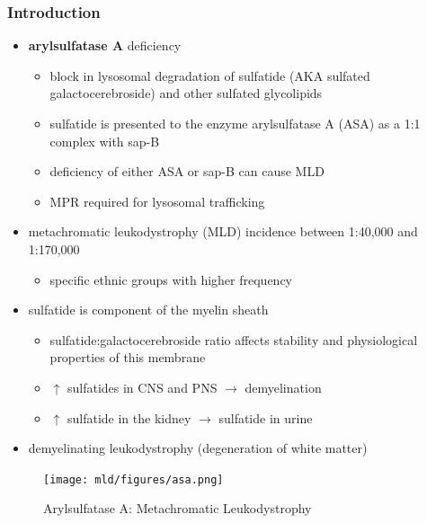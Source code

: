 \documentclass[12pt]{scrartcl}
\begin{document}
\subsubsection{Introduction}
\label{sec:org5ee830d}
\begin{itemize}
\item \textbf{arylsulfatase A} deficiency
\begin{itemize}
\item block in lysosomal degradation of sulfatide (AKA sulfated
galactocerebroside) and other sulfated glycolipids
\item sulfatide is presented to the enzyme arylsulfatase A (ASA) as a
1:1 complex with sap-B
\item deficiency of either ASA or sap-B can cause MLD
\item MPR required for lysosomal trafficking
\end{itemize}
\item metachromatic leukodystrophy (MLD) incidence between 1:40,000 and 1:170,000
\begin{itemize}
\item specific ethnic groups with higher frequency
\end{itemize}

\item sulfatide is component of the myelin sheath
\begin{itemize}
\item sulfatide:galactocerebroside ratio affects stability and
physiological properties of this membrane
\item \(\uparrow\) sulfatides in CNS and PNS \(\to\) demyelination
\item \(\uparrow\) sulfatide in the kidney \(\to\) sulfatide in urine
\end{itemize}
\item demyelinating leukodystrophy (degeneration of white matter)
\end{itemize}

\begin{figure}[htbp]
\centering
\texttt{[image: mld/figures/asa.png]}
\caption{\label{fig:org13aef35}Arylsulfatase A: Metachromatic Leukodystrophy}
\end{figure}
\end{document}
